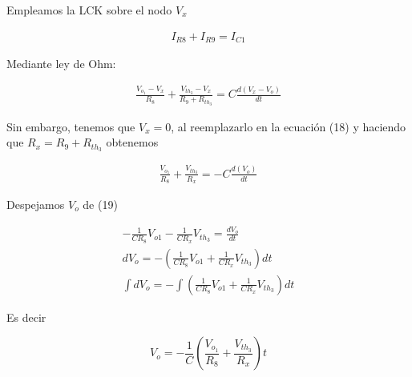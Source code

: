\documentclass{article}
\begin{document}
Empleamos la LCK sobre el nodo $V_x$

\begin{align}
	I_{R8} + I_{R9} = I_{C1}
\end{align}

Mediante ley de Ohm:

\begin{align}
	\frac{V_{o_1} - V_x}{R_8} + \frac{V_{th_3} - V_x}{R_9 + R_{th_3}} = C\frac{d(V_x - V_o)}{dt}
\end{align}


Sin embargo, tenemos que $V_x = 0$, al reemplazarlo en la ecuación (18) y haciendo que $R_x = R_9 + R_{th_3}$ obtenemos

\begin{align}
	\frac{V_{o_1}}{R_8} + \frac{V_{th_3}}{R_x} = -C\frac{d(V_o)}{dt}
\end{align}

Despejamos $V_o$ de (19)

\begin{align}
	-\frac{1}{CR_8}V_{o1} - \frac{1}{CR_x}V_{th_3} = \frac{dV_o}{dt} \nonumber \\
	dV_o = - \left( \frac{1}{CR_8}V_{o1} + \frac{1}{CR_x}V_{th_3} \right)dt \nonumber \\
	\int dV_o = - \int \left( \frac{1}{CR_8}V_{o1} + \frac{1}{CR_x}V_{th_3} \right)dt
\end{align}

Es decir

\begin{tcolorbox}[colback=red!5!white,colframe=red!75!black,arc=0mm,boxrule=0mm,width=(\linewidth+0.5cm)]
	\begin{equation}
		V_o = - \frac{1}{C} \left( \frac{V_{o_1}}{R_8} + \frac{V_{th_3}}{R_x} \right) t
	\end{equation}
\end{tcolorbox}
\end{document}
